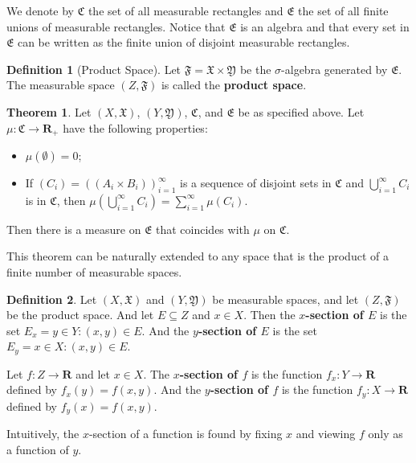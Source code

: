 \documentclass[12pt,a4paper]{article}
\theoremstyle{definition}
\newtheorem{theorem}{Theorem}[section]
\newtheorem{definition}{Definition}[section]
\begin{document}
We denote by $\mathfrak{C}$ the set of all measurable rectangles and $\mathfrak{E}$ the set of all finite unions of measurable rectangles. Notice that $\mathfrak{E}$ is an algebra and that every set in $\mathfrak{E}$ can be written as the finite union of disjoint measurable rectangles.

\begin{definition}[Product Space]
	Let $\mathfrak{F} = \mathfrak{X} \times \mathfrak{Y}$ be the $\sigma$-algebra generated by $\mathfrak{E}$. The measurable space $(Z, \mathfrak{F})$ is called the \textbf{product space}.
\end{definition}

\begin{theorem}
	Let $(X, \mathfrak{X})$, $(Y, \mathfrak{Y})$, $\mathfrak{C}$, and $\mathfrak{E}$ be as specified above. Let $\mu : \mathfrak{C} \longrightarrow \textbf{R}_+$ have the following properties:
	\begin{itemize}
		\item $\mu(\emptyset) = 0$;
  		\item  If $(C_i) = ((A_i \times B_i))_{i=1}^\infty$ is a sequence of disjoint sets in $\mathfrak{C}$ and $\bigcup_{i=1}^\infty C_i$ is in $\mathfrak{C}$, then $\mu \left( \bigcup_{i=1}^\infty C_i \right) = \sum_{i=1}^\infty \mu(C_i)$.
	\end{itemize}
	Then there is a measure on $\mathfrak{E}$ that coincides with $\mu$ on $\mathfrak{C}$.
\end{theorem}

This theorem can be naturally extended to any space that is the product of a finite number of measurable spaces.

\begin{definition}
	Let $(X, \mathfrak{X})$ and $(Y, \mathfrak{Y})$ be measurable spaces, and let $(Z, \mathfrak{F})$ be the product space. And let $E \subseteq Z$ and $x \in X$. Then the \textbf{$x$-section of $E$} is the set $E_x = {y \in Y : (x, y) \in E}$. And the \textbf{$y$-section of $E$} is the set $E_y = {x \in X : (x, y) \in E}$.

	Let $f : Z \longrightarrow \textbf{R}$ and let $x \in X$. The \textbf{$x$-section of $f$} is the function $f_x : Y \longrightarrow \textbf{R}$ defined by $f_x(y) = f(x,y)$. And the \textbf{$y$-section of $f$} is the function $f_y : X \longrightarrow \textbf{R}$ defined by $f_y(x) = f(x,y)$.
\end{definition}

Intuitively, the $x$-section of a function is found by fixing $x$ and viewing $f$ only as a function of $y$.
\end{document}
